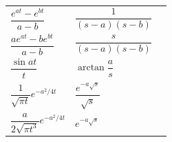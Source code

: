 \documentclass[a4paper, 10pt, ]{article}
\begin{document}
\begin{longtable}[l]{p{3.7cm} @{} p{5.9cm} p{2.8cm}}
    $\dfrac{e^{at}-e^{bt}}{a-b}$            & $\dfrac{1}{(s-a)(s-b)}$               \\[4mm]
    $\dfrac{ae^{at}-be^{bt}}{a-b}$          & $\dfrac{s}{(s-a)(s-b)}$               \\[4mm]
    $\dfrac{\sin at}{t}$                    & $\arctan \dfrac{a}{s}$                \\[4mm]
    $\dfrac{1}{\sqrt{\pi t}}e^{-a^2/4t}$    & $\dfrac{e^{-a\sqrt{s}}}{\sqrt{s}}$    \\[4mm]
    $\dfrac{a}{2\sqrt{\pi t^3}}e^{-a^2/4t}$ & $e^{-a\sqrt{s}}$                      \\[4mm]

    \bottomrule

\end{longtable}











\end{document}
